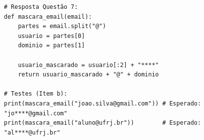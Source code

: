 \ifmostrarGabarito
\begin{verbatim}
# Resposta Questão 7:
def mascara_email(email):
    partes = email.split("@")
    usuario = partes[0]
    dominio = partes[1]
    
    usuario_mascarado = usuario[:2] + "****"
    return usuario_mascarado + "@" + dominio

# Testes (Item b):
print(mascara_email("joao.silva@gmail.com")) # Esperado: "jo****@gmail.com"
print(mascara_email("aluno@ufrj.br"))        # Esperado: "al****@ufrj.br"
\end{verbatim}
\fi
